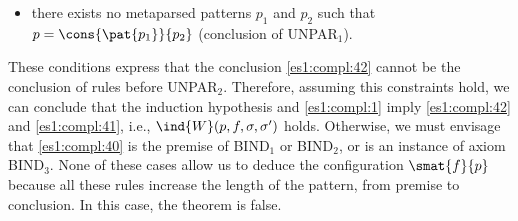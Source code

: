 \begin{enumerate}
\begin{itemize}
\begin{itemize}
        \item there exists no meta\-parsed patterns \({p}_1\) and
          \({p}_2\) such that \({p} = \cons{\pat{{p}_1}}{{p}_2}\)
          (conclusion of \textsf{UNPAR}\(_1\)).

      \end{itemize}
          These conditions express that the conclusion
          \eqref{es1:compl:42} cannot be the conclusion of rules
          before \textsf{UNPAR}\(_2\). Therefore, assuming this
          constraints hold, we can conclude that the induction
          hypothesis and \eqref{es1:compl:1} imply
          \eqref{es1:compl:42} and \eqref{es1:compl:41}, i.e.,
          \(\ind{W}({p}, f, \sigma, \sigma')\) holds. Otherwise, we
          must envisage that \eqref{es1:compl:40} is the premise of
          \textsf{BIND}\(_1\) or \textsf{BIND}\(_2\), or is an
          instance of axiom \textsf{BIND}\(_3\). None of these cases
          allow us to deduce the configuration \(\smat{f}{{p}}\)
          because all these rules increase the length of the pattern,
          from premise to conclusion. In this case, the theorem is
          false.

    \end{itemize}


\end{enumerate}
